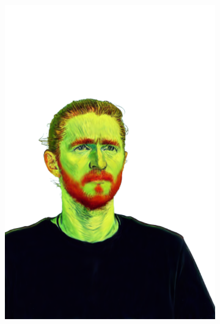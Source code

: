 \begin{figure}[ht]
\begin{subfigure}{0.08\linewidth}
        \includegraphics[width=\textwidth]{Figures/results/low/ephra_vangogh/11_render.png}

\end{subfigure}
\end{figure}

